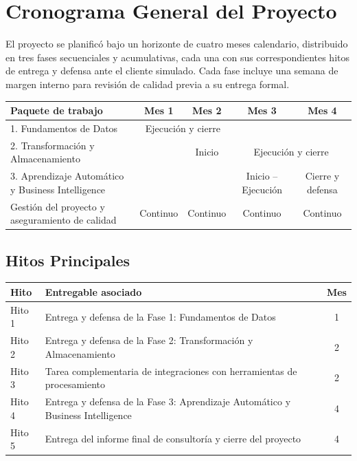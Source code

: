 \documentclass[12pt,a4paper]{article}
\begin{document}
\newpage
\section{Cronograma General del Proyecto}

El proyecto se planificó bajo un horizonte de cuatro meses calendario, distribuido en tres fases
secuenciales y acumulativas, cada una con sus correspondientes hitos de entrega y defensa ante
el cliente simulado. Cada fase incluye una semana de margen interno para revisión de calidad
previa a su entrega formal.

\vspace{6pt}
{\small
\begin{tabularx}{\linewidth}{@{} X c c c c @{}}
  \toprule
  \textbf{Paquete de trabajo} & \textbf{Mes 1} & \textbf{Mes 2} & \textbf{Mes 3} & \textbf{Mes 4} \\
  \midrule
  1. Fundamentos de Datos
    & \multicolumn{2}{c}{Ejecución y cierre} & & \\[4pt]
  2. Transformación y Almacenamiento
    & & Inicio & \multicolumn{2}{c}{Ejecución y cierre} \\[4pt]
  3. Aprendizaje Automático y Business Intelligence
    & & & Inicio -- Ejecución & Cierre y defensa \\[4pt]
  Gestión del proyecto y aseguramiento de calidad
    & Continuo & Continuo & Continuo & Continuo \\
  \bottomrule
\end{tabularx}
}

\vspace{14pt}
\subsection{Hitos Principales}

\vspace{4pt}
{\small
\begin{tabularx}{\linewidth}{@{} l X c @{}}
  \toprule
  \textbf{Hito} & \textbf{Entregable asociado} & \textbf{Mes} \\
  \midrule
  Hito 1 & Entrega y defensa de la Fase 1: Fundamentos de Datos & 1 \\[3pt]
  Hito 2 & Entrega y defensa de la Fase 2: Transformación y Almacenamiento & 2 \\[3pt]
  Hito 3 & Tarea complementaria de integraciones con herramientas de procesamiento & 2 \\[3pt]
  Hito 4 & Entrega y defensa de la Fase 3: Aprendizaje Automático y Business Intelligence & 4 \\[3pt]
  Hito 5 & Entrega del informe final de consultoría y cierre del proyecto & 4 \\
  \bottomrule
\end{tabularx}
}
\end{document}
